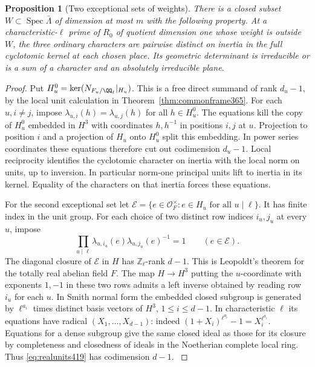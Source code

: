 \documentclass[a4paper,11pt]{article}
\newtheorem{proposition}{Proposition}[section]
\theoremstyle{definition}
\theoremstyle{remark}
\newcommand{\ZZ}{\mathbb Z}\newcommand{\ord}{\operatorname{ord}}
\numberwithin{equation}{section}
\begin{document}
\begin{proposition}[Two exceptional sets of weights]\leavevmode
\label{prop:badweights419}
There is a closed subset \(W\subset\operatorname{Spec}\bar\Lambda\)
of dimension at most \(m\) with the following property. At a
characteristic-\(\ell\) prime of \(R_0\) of quotient dimension
one whose weight is outside \(W\), the three ordinary characters
are pairwise distinct on inertia in the full cyclotomic kernel
at each chosen place. Its geometric determinant is irreducible
or is a sum of a character and an absolutely irreducible plane.
\end{proposition}
\begin{proof}
Put \(H_u^0=\ker(N_{F_u/\QQ_\ell}|_{H_u})\). This is a free
direct summand of rank \(d_u-1\), by the local unit calculation
in Theorem~\ref{thm:commonframe365}. For each \(u,i\ne j\),
impose \(\lambda_{u,i}(h)=\lambda_{u,j}(h)\) for all
\(h\in H_u^0\). The equations kill the copy of \(H_u^0\)
embedded in \(H^3\) with coordinates \(h,h^{-1}\) in
positions \(i,j\) at \(u\). Projection to position \(i\)
and a projection of \(H_u\) onto \(H_u^0\) split this
embedding. In power series coordinates these equations
therefore cut out codimension \(d_u-1\). Local reciprocity
identifies the cyclotomic character on inertia with the
local norm on units, up to inversion. In particular norm-one
principal units lift to inertia in its kernel. Equality of
the characters on that inertia forces these equations.

For the second exceptional set let
\(\mathcal E=\{e\in\mathcal O_F^\times:e\in H_u
\text{ for all }u\mid\ell\}\). It has finite index in the
unit group. For each choice of two distinct row indices
\(i_u,j_u\) at every \(u\), impose
\begin{equation}
       \prod_{u\mid\ell}
           \lambda_{u,i_u}(e)\lambda_{u,j_u}(e)^{-1}=1
                              \qquad(e\in\mathcal E).
       \label{eq:realunits419}
\end{equation}
The diagonal closure of \(\mathcal E\) in \(H\) has
\(\ZZ_\ell\)-rank \(d-1\). This is Leopoldt's theorem
for the totally real abelian field \(F\). The map
\(H\to H^3\) putting the \(u\)-coordinate with exponents
\(1,-1\) in these two rows admits a left inverse obtained
by reading row \(i_u\) for each \(u\).
In Smith normal form the embedded closed subgroup is
generated by \(\ell^{a_i}\) times distinct basis vectors
of \(H^3\), \(1\le i\le d-1\). In characteristic \(\ell\)
its equations have radical \((X_1,\ldots,X_{d-1})\):
indeed \((1+X_i)^{\ell^{a_i}}-1=X_i^{\ell^{a_i}}\).
Equations for a dense subgroup give the same closed ideal
as those for its closure by completeness and closedness of
ideals in the Noetherian complete local ring.
Thus \eqref{eq:realunits419} has codimension \(d-1\).
\cite{IX-VII-brumer330}


\end{proof}
\end{document}
